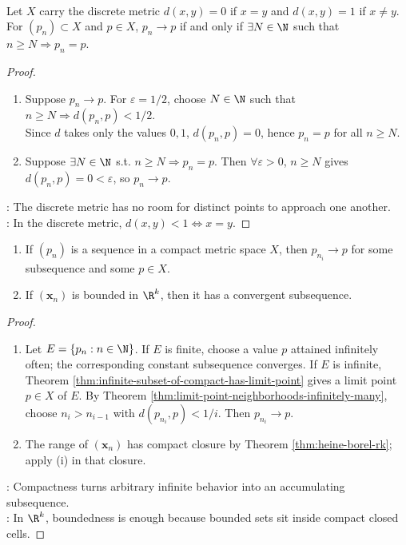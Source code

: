 \begin{proposition} \label{prop:discrete-metric-convergence-eventually-constant} \\
Let $X$ carry the discrete metric $d(x,y)=0$ if $x=y$ and $d(x,y)=1$ if $x\neq y$.\\
For $(p_n)\subset X$ and $p\in X$, $p_n\to p$ if and only if $\exists N\in\N$ such that $n\geq N\Longrightarrow p_n=p$.
\begin{proof}
\begin{enumerate}[label=\roman*.]
\setlength{\itemsep}{0pt}
\item[$(\Rightarrow)$] Suppose $p_n\to p$. For $\varepsilon=1/2$, choose $N\in\N$ such that $n\geq N\Longrightarrow d(p_n,p)<1/2$.\\
Since $d$ takes only the values $0,1$, $d(p_n,p)=0$, hence $p_n=p$ for all $n\geq N$.
\item[$(\Leftarrow)$] Suppose $\exists N\in\N$ s.t. $n\geq N\Longrightarrow p_n=p$. Then $\forall \varepsilon>0$, $n\geq N$ gives $d(p_n,p)=0<\varepsilon$, so $p_n\to p$.
\end{enumerate}
: The discrete metric has no room for distinct points to approach one another.\\
: In the discrete metric, $d(x,y)<1\Longleftrightarrow x=y$.
\end{proof}
\end{proposition}


\begin{theorem} \label{thm:compact-sequential-subsequence} 
\begin{enumerate}[label=(\roman*)]
\setlength{\itemsep}{0pt}
\item If $(p_n)$ is a sequence in a compact metric space $X$, then $p_{n_i}\to p$ for some subsequence and some $p\in X$.
\item If $(\mathbf{x}_n)$ is bounded in $\R^k$, then it has a convergent subsequence.
\end{enumerate}
\begin{proof}
\begin{enumerate}[label=(\roman*)]
\setlength{\itemsep}{0pt}
\item Let $E=\{p_n:n\in\N\}$. If $E$ is finite, choose a value $p$ attained infinitely often; the corresponding constant subsequence converges. If $E$ is infinite, Theorem \ref{thm:infinite-subset-of-compact-has-limit-point} gives a limit point $p\in X$ of $E$. By Theorem \ref{thm:limit-point-neighborhoods-infinitely-many}, choose $n_i>n_{i-1}$ with $d(p_{n_i},p)<1/i$. Then $p_{n_i}\to p$.
\item The range of $(\mathbf{x}_n)$ has compact closure by Theorem \ref{thm:heine-borel-rk}; apply (i) in that closure.
\end{enumerate}
: Compactness turns arbitrary infinite behavior into an accumulating subsequence.\\
: In $\R^k$, boundedness is enough because bounded sets sit inside compact closed cells.
\end{proof}
\end{theorem}

